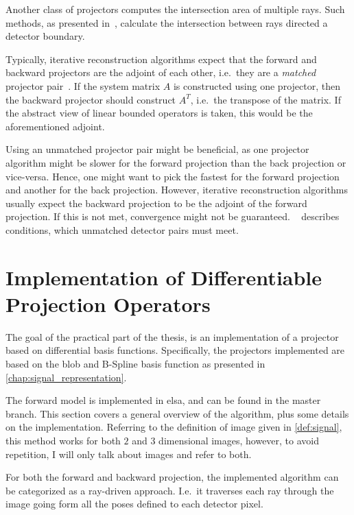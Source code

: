 Another class of projectors computes the intersection area of multiple rays. Such methods, as
presented in~\cite{ha_study_2015,ha_efficient_2016,ha_look-up_2018}, calculate the intersection
between rays directed a detector boundary.

Typically, iterative reconstruction algorithms expect that the forward and backward projectors are
the adjoint of each other, i.e.\ they are a \textit{matched} projector
pair~\cite{zeng_unmatched_2000}. If the system matrix \(A\) is constructed using one projector, then
the backward projector should construct \(A^T\), i.e.\ the transpose of the matrix. If the abstract
view of linear bounded operators is taken, this would be the aforementioned adjoint.

Using an unmatched projector pair might be beneficial, as one projector algorithm might be slower
for the forward projection than the back projection or vice-versa. Hence, one might want to pick the
fastest for the forward projection and another for the back projection. However, iterative
reconstruction algorithms usually expect the backward projection to be the adjoint of the forward
projection. If this is not met, convergence might not be guaranteed.
\citeauthor*{zeng_unmatched_2000}~\cite{zeng_unmatched_2000} describes conditions, which unmatched
detector pairs must meet.

\section{Implementation of Differentiable Projection Operators}\label{sec:implementation}

The goal of the practical part of the thesis, is an implementation of a projector based on
differential basis functions. Specifically, the projectors implemented are based on the blob and
B-Spline basis function as presented in \autoref{chap:signal_representation}.

The forward model is implemented in elsa, and can be found in the master branch. This section covers
a general overview of the algorithm, plus some details on the implementation. Referring to the
definition of image given in \autoref{def:signal}, this method works for both \(2\) and \(3\)
dimensional images, however, to avoid repetition, I will only talk about images and refer to both.

For both the forward and backward projection, the implemented algorithm can be categorized as a
ray-driven approach. I.e.\ it traverses each ray through the image going form all the poses defined
to each detector pixel.

